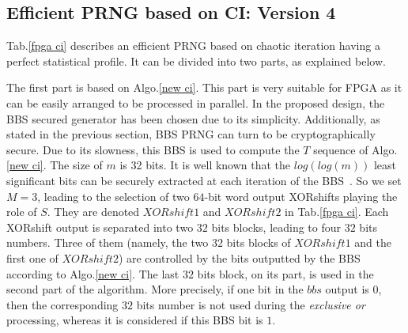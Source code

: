 \begin{table}
\centering
{}
\end{table}


\subsection{Efficient PRNG based on CI: Version 4}
\label{prng fpga}
Tab.\ref{fpga ci} describes an efficient 
PRNG based on chaotic iteration having a perfect statistical profile.
It can be divided into two parts, as explained below. 


The first part is based on Algo.\ref{new ci}.
This part is very suitable for FPGA as it can be easily 
arranged to be processed in parallel.
In the proposed design, the BBS secured generator has been chosen 
due to its simplicity. Additionally, as stated in the previous section, 
BBS PRNG can turn to be cryptographically secure.
Due to its slowness, this BBS is used to compute the $T$ sequence of Algo.\ref{new ci}.
The size of $m$ is 32 bits. 
It is well known that the $log(log(m))$ least significant bits 
can be securely extracted at each iteration of the BBS~\cite{vmd}.
So we set $M = 3$, leading to the selection of two $64$-bit word output XORshifts 
playing the role of $S$. They are denoted $XORshift1$ and $XORshift2$ 
in Tab.\ref{fpga ci}. 
Each XORshift output is separated into two $32$ bits blocks, leading to 
four $32$ bits numbers. 
Three of them (namely, the two $32$ bits blocks of $XORshift1$ 
and the first one of $XORshift2$) are controlled by the bits outputted
by the BBS according to Algo.\ref{new ci}.
The last $32$ bits block, on its part, is used in the second part of the algorithm.
More precisely, if one bit in the $bbs$ output is $0$, then the corresponding 
$32$ bits number is not used during the \emph{exclusive or} processing, 
whereas it is considered if this BBS bit is $1$.

